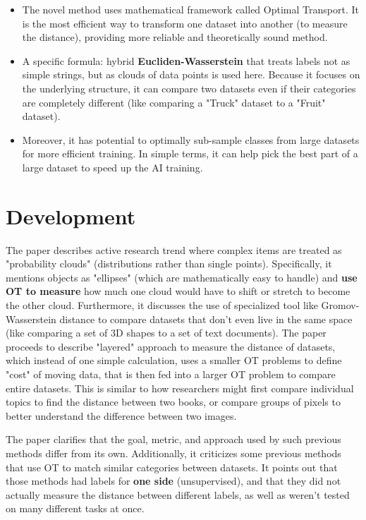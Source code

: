 \documentclass[11pt, a4paper]{article}
\theoremstyle{plain} %
\theoremstyle{definition} %
\begin{document}
\begin{itemize}
				\item The novel method uses mathematical framework called Optimal Transport. It is the most efficient way to transform one dataset into another (to measure the distance), providing more reliable and theoretically sound method.
				\item A specific formula: hybrid \textbf{Eucliden-Wasserstein} that treats labels not as simple strings, but as clouds of data points is used here. Because it focuses on the underlying structure, it can compare two datasets even if their categories are completely different (like comparing a "Truck" dataset to a "Fruit" dataset).
				\item Moreover, it has potential to optimally sub-sample classes from large datasets for more efficient training. In simple terms, it can help pick the best part of a large dataset to speed up the AI training.
			\end{itemize}



	\section{Development}
	\label{sec:development}
		The paper describes active research trend where complex items are treated as "probability clouds" (distributions rather than single points). Specifically, it mentions objects as "ellipses" (which are mathematically easy to handle) and \textbf{use OT to measure} how much one cloud would have to shift or stretch to become the other cloud. Furthermore, it discusses the use of specialized tool like Gromov-Wasserstein distance to compare datasets that don't even live in the same space (like comparing a set of 3D shapes to a set of text documents). The paper proceeds to describe "layered" approach to measure the distance of datasets, which instead of one simple calculation, uses a smaller OT problems to define "cost" of moving data, that is then fed into a larger OT problem to compare entire datasets. This is similar to how researchers might first compare individual topics to find the distance between two books, or compare groups of pixels to better understand the difference between two images.

		The paper clarifies that the goal, metric, and approach used by such previous methods differ from its own. Additionally, it criticizes some previous methods that use OT to match similar categories between datasets. It points out that those methods had labels for \textbf{one side} (unsupervised), and that they did not actually measure the distance between different labels, as well as weren't tested on many different tasks at once.
\end{document}
